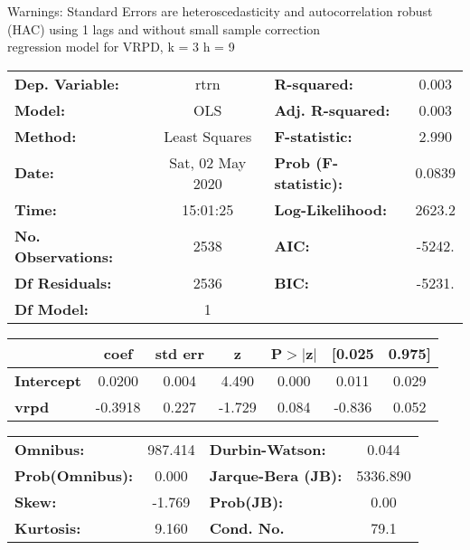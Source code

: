 Warnings: \newline
 [1] Standard Errors are heteroscedasticity and autocorrelation robust (HAC) using 1 lags and without small sample correction\\ 

regression model for VRPD, k = 3 h = 9\begin{center}
\begin{tabular}{lclc}
\toprule
\textbf{Dep. Variable:}    &       rtrn       & \textbf{  R-squared:         } &     0.003   \\
\textbf{Model:}            &       OLS        & \textbf{  Adj. R-squared:    } &     0.003   \\
\textbf{Method:}           &  Least Squares   & \textbf{  F-statistic:       } &     2.990   \\
\textbf{Date:}             & Sat, 02 May 2020 & \textbf{  Prob (F-statistic):} &   0.0839    \\
\textbf{Time:}             &     15:01:25     & \textbf{  Log-Likelihood:    } &    2623.2   \\
\textbf{No. Observations:} &        2538      & \textbf{  AIC:               } &    -5242.   \\
\textbf{Df Residuals:}     &        2536      & \textbf{  BIC:               } &    -5231.   \\
\textbf{Df Model:}         &           1      & \textbf{                     } &             \\
\bottomrule
\end{tabular}
\begin{tabular}{lcccccc}
                   & \textbf{coef} & \textbf{std err} & \textbf{z} & \textbf{P$> |$z$|$} & \textbf{[0.025} & \textbf{0.975]}  \\
\midrule
\textbf{Intercept} &       0.0200  &        0.004     &     4.490  &         0.000        &        0.011    &        0.029     \\
\textbf{vrpd}      &      -0.3918  &        0.227     &    -1.729  &         0.084        &       -0.836    &        0.052     \\
\bottomrule
\end{tabular}
\begin{tabular}{lclc}
\textbf{Omnibus:}       & 987.414 & \textbf{  Durbin-Watson:     } &    0.044  \\
\textbf{Prob(Omnibus):} &   0.000 & \textbf{  Jarque-Bera (JB):  } & 5336.890  \\
\textbf{Skew:}          &  -1.769 & \textbf{  Prob(JB):          } &     0.00  \\
\textbf{Kurtosis:}      &   9.160 & \textbf{  Cond. No.          } &     79.1  \\
\bottomrule
\end{tabular}
\end{center}

